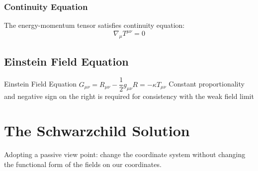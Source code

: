 \documentclass[12pt,a4paper]{article}
\begin{document}
        \subsubsection{Continuity Equation}
        The energy-momentum tensor satisfies continuity equation:
        \begin{equation*}
            \nabla_\mu T^{\mu\nu} = 0
        \end{equation*}
    \subsection{Einstein Field Equation}
    \begin{definition}
        {Einstein Field Equation}
        {$G_{\mu\nu}=R_{\mu\nu}-\dfrac{1}{2}g_{\mu\nu}R=-\kappa T_{\mu\nu}$}
        {Constant proportionality and negative sign on the right is required for consistency with the weak field limit}
    \end{definition}
\section{The Schwarzchild Solution}
Adopting a passive view point: change the coordinate system without changing the functional form of the fields on our coordinates.
\end{document}
